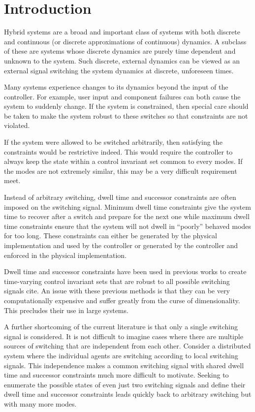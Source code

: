 \section{Introduction}
Hybrid systems are a broad and important class of systems with both discrete and continuous (or discrete approximations of continuous) dynamics. A subclass of these are systems whose discrete dynamics are purely time dependent and unknown to the system. Such discrete, external dynamics can be viewed as an external signal switching the system dynamics at discrete, unforeseen times. 

Many systems experience changes to its dynamics beyond the input of the controller. For example, user input and component failures can both cause the system to suddenly change. If the system is constrained, then special care should be taken to make the system robust to these switches so that constraints are not violated. 

If the system were allowed to be switched arbitrarily, then satisfying the constraints would be restrictive indeed. This would require the controller to always keep the state within a control invariant set common to every modes. If the modes are not extremely similar, this may be a very difficult requirement meet. 

Instead of arbitrary switching, dwell time and successor constraints are often imposed on the switching signal. Minimum dwell time constraints give the system time to recover after a switch and prepare for the next one while maximum dwell time constraints ensure that the system will not dwell in ``poorly'' behaved modes for too long. These constraints can either be generated by the physical implementation and used by the controller or generated by the controller and enforced in the physical implementation.

Dwell time and successor constraints have been used in previous works to create time-varying control invariant sets that are robust to all possible switching signals \alert{cite}. An issue with these previous methods is that they can be very computationally expensive and suffer greatly from the curse of dimensionality. This precludes their use in large systems. 

A further shortcoming of the current literature is that only a single switching signal is considered. It is not difficult to imagine cases where there are multiple sources of switching that are independent from each other. Consider a distributed system where the individual agents are switching according to local switching signals. This independence makes a common switching signal with shared dwell time and successor constraints much more difficult to motivate. Seeking to enumerate the possible states of even just two switching signals and define their dwell time and successor constraints leads quickly back to arbitrary switching but with many more modes.


